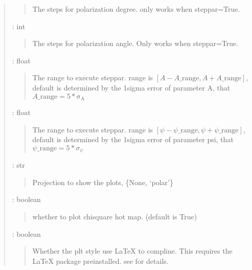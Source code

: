 \documentclass[letterpaper,10pt,english]{sphinxmanual}
\begin{document}
\begin{fulllineitems}
\begin{fulllineitems}
\begin{quote}
\begin{description}
\begin{quote}
\sphinxAtStartPar
The steps for polarization degree. only works when steppar=True.
\end{quote}

\sphinxAtStartPar
{} : int
\begin{quote}

\sphinxAtStartPar
The steps for polarization angle. Only works when steppar=True.
\end{quote}

\sphinxAtStartPar
{} : float
\begin{quote}

\sphinxAtStartPar
The range to execute steppar. range is \([A-A\_\mathrm{range}, A+A\_\mathrm{range}]\), default is
determined by the 1sigma error of parameter A, that \(A\_\mathrm{range} = 5*\mathrm{\sigma_A}\)
\end{quote}

\sphinxAtStartPar
{} : float
\begin{quote}

\sphinxAtStartPar
The range to execute steppar. range is \([\psi-\psi\_\mathrm{range}, \psi+\psi\_\mathrm{range}]\), default is
determined by the 1sigma error of parameter psi, that \(\psi\_\mathrm{range} = 5*\sigma_{\psi}\)
\end{quote}

\sphinxAtStartPar
{} : str
\begin{quote}

\sphinxAtStartPar
Projection to show the plots, \{None, ‘polar’\}
\end{quote}

\sphinxAtStartPar
{} : boolean
\begin{quote}

\sphinxAtStartPar
whether to plot chisquare hot map. (default is True)
\end{quote}

\sphinxAtStartPar
{} : boolean
\begin{quote}

\sphinxAtStartPar
Whether the plt style use LaTeX to compline. This requires the LaTeX package
pre\sphinxhyphen{}installed. see  for details.
\end{quote}

\end{description}\end{quote}


\end{fulllineitems}
\end{fulllineitems}
\end{document}

